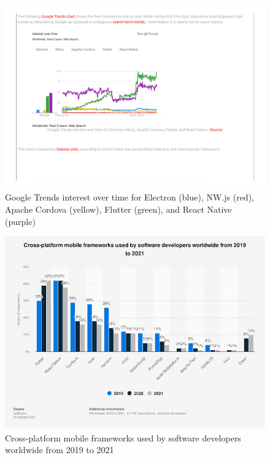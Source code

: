 \documentclass[sigconf]{acmart}
\begin{document}
\begin{figure}[H]
    \centering
    \includegraphics[clip, trim=3.5cm 8.2cm 12cm 4.5cm, width=\columnwidth]{Google Trends.pdf}
    \caption{Google Trends interest over time for Electron (blue), NW.js (red), Apache Cordova (yellow), Flutter (green), and React Native (purple)}
    \label{fig:googletrends}
\end{figure}

\begin{figure}[H]
    \centering
    \includegraphics[width=\columnwidth]{statista.png}
    \caption{Cross-platform mobile frameworks used by software developers worldwide from 2019 to 2021}
    \label{fig:statista}
\end{figure}
\end{document}
